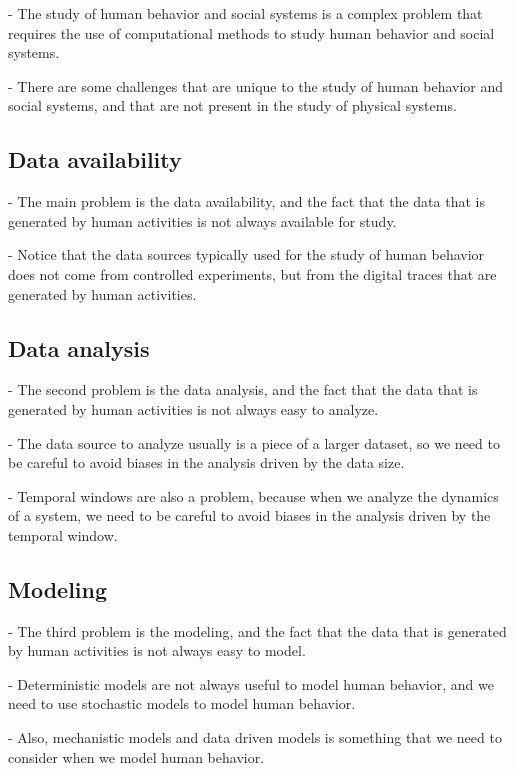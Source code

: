 - The study of human behavior and social systems is a complex problem that requires the use of computational methods to study human behavior and social systems.

- There are some challenges that are unique to the study of human behavior and social systems, and that are not present in the study of physical systems.

\subsection{\label{subsec:Data availability} Data availability}

- The main problem is the data availability, and the fact that the data that is generated by human activities is not always available for study.

- Notice that the data sources typically used for the study of human behavior does not come from controlled experiments, but from the digital traces that are generated by human activities.

\subsection{\label{subsec:Data analysis} Data analysis}

- The second problem is the data analysis, and the fact that the data that is generated by human activities is not always easy to analyze.

- The data source to analyze usually is a piece of a larger dataset, so we need to be careful to avoid biases in the analysis driven by the data size.

- Temporal windows are also a problem, because when we analyze the dynamics of a system, we need to be careful to avoid biases in the analysis driven by the temporal window.

\subsection{\label{subsec:Modeling} Modeling}

- The third problem is the modeling, and the fact that the data that is generated by human activities is not always easy to model. 

- Deterministic models are not always useful to model human behavior, and we need to use stochastic models to model human behavior.

- Also, mechanistic models and data driven models is something that we need to consider when we model human behavior.

